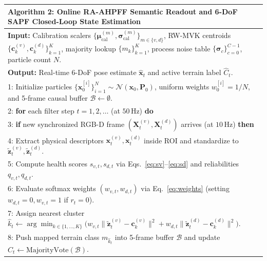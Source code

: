 \documentclass[11pt, a4paper]{article}
\begin{document}
\begin{table}[htbp]
    \centering
    \footnotesize
    \begin{tabularx}{\textwidth}{X}
        \toprule
        \textbf{Algorithm 2:} Online RA-AHPFF Semantic Readout and 6-DoF SAPF Closed-Loop State Estimation \\
        \midrule
        \textbf{Input:} Calibration scalers $\{\bm{\mu}_{\text{cal}}^{(m)}, \bm{\sigma}_{\text{cal}}^{(m)}\}_{m\in\{v,d\}}$, RW-MVK centroids $\{\mathbf{c}_k^{(v)}, \mathbf{c}_k^{(d)}\}_{k=1}^K$, majority lookup $\{m_k\}_{k=1}^K$, process noise table $\{\bm{\sigma}_c\}_{c=0}^{C-1}$, particle count $N$. \\
        \textbf{Output:} Real-time 6-DoF pose estimate $\hat{\mathbf{x}}_t$ and active terrain label $\hat{C}_t$. \\[2pt]
        1: Initialize particles $\{\mathbf{x}_0^{[i]}\}_{i=1}^N \sim \mathcal{N}(\mathbf{x}_0, \mathbf{P}_0)$, uniform weights $w_0^{[i]} = 1/N$, and 5-frame causal buffer $\mathcal{B} \gets \emptyset$. \\
        2: \textbf{for} each filter step $t = 1, 2, \dots$ (at $50\,\text{Hz}$) \textbf{do} \\
        3: \hspace*{1.5em} \textbf{if} new synchronized RGB-D frame $(\mathbf{X}_t^{(v)}, \mathbf{X}_t^{(d)})$ arrives (at $10\,\text{Hz}$) \textbf{then} \\
        4: \hspace*{3.0em} Extract physical descriptors $\mathbf{x}_t^{(v)}, \mathbf{x}_t^{(d)}$ inside ROI and standardize to $\tilde{\mathbf{z}}_t^{(v)}, \tilde{\mathbf{z}}_t^{(d)}$. \\
        5: \hspace*{3.0em} Compute health scores $s_{v,t}, s_{d,t}$ via Eqs.~\eqref{eq:sv}--\eqref{eq:sd} and reliabilities $q_{v,t}, q_{d,t}$. \\
        6: \hspace*{3.0em} Evaluate softmax weights $(w_{v,t}, w_{d,t})$ via Eq.~\eqref{eq:weights} (setting $w_{d,t}=0, w_{v,t}=1$ if $r_t=0$). \\
        7: \hspace*{3.0em} Assign nearest cluster $\hat{k}_t \gets \arg\min_{k \in \{1,\dots,K\}} \big(w_{v,t}\|\tilde{\mathbf{z}}_t^{(v)} - \mathbf{c}_k^{(v)}\|^2 + w_{d,t}\|\tilde{\mathbf{z}}_t^{(d)} - \mathbf{c}_k^{(d)}\|^2\big)$. \\
        8: \hspace*{3.0em} Push mapped terrain class $m_{\hat{k}_t}$ into 5-frame buffer $\mathcal{B}$ and update $\hat{C}_t \gets \text{MajorityVote}(\mathcal{B})$. \\

\end{tabularx}
\end{table}
\end{document}
